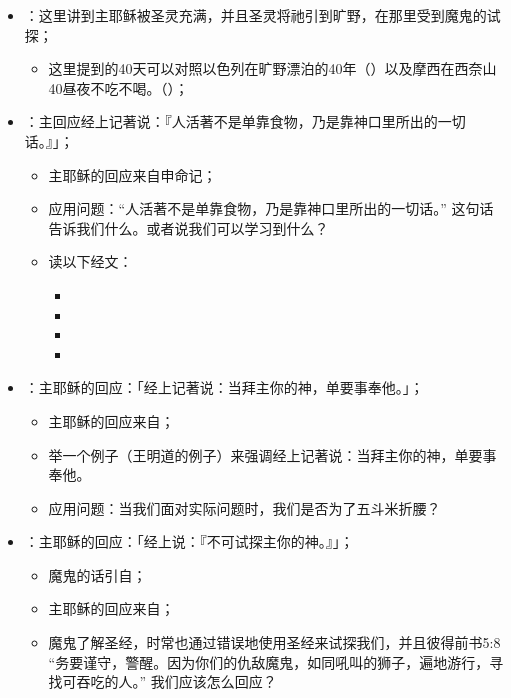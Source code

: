 \begin{itemize}
  \item {}：这里讲到主耶稣被圣灵充满，并且圣灵将祂引到旷野，在那里受到魔鬼的试探；
  \begin{itemize}
    \item 这里提到的40天可以对照以色列在旷野漂泊的40年（）以及摩西在西奈山40昼夜不吃不喝。（）；
  \end{itemize}
  \item {}：主回应经上记著说：『人活著不是单靠食物，乃是靠神口里所出的一切话。』」；
  \begin{itemize}
    \item 主耶稣的回应来自申命记；
    \item 应用问题：“人活著不是单靠食物，乃是靠神口里所出的一切话。” 这句话告诉我们什么。或者说我们可以学习到什么？ 
    \item 读以下经文：
    \begin{itemize}
      \item {}
      \item {}
      \item {}
      \item {}
    \end{itemize}
  \end{itemize}
  \item {}：主耶稣的回应：「经上记著说：当拜主你的神，单要事奉他。」；
  \begin{itemize}
    \item 主耶稣的回应来自；
    \item 举一个例子（王明道的例子）来强调经上记著说：当拜主你的神，单要事奉他。
    \item 应用问题：当我们面对实际问题时，我们是否为了五斗米折腰？
  \end{itemize}
  \item {}：主耶稣的回应：「经上说：『不可试探主你的神。』」；
  \begin{itemize}
    \item 魔鬼的话引自；
    \item 主耶稣的回应来自；
    \item 魔鬼了解圣经，时常也通过错误地使用圣经来试探我们，并且彼得前书5:8 “务要谨守，警醒。因为你们的仇敌魔鬼，如同吼叫的狮子，遍地游行，寻找可吞吃的人。” 我们应该怎么回应？
  \end{itemize}
\end{itemize}


